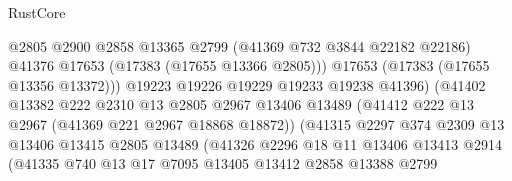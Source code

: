 \begin{lexlean}{RustCore}
\begin{coremodule}
                                          @2805
                                          @2900
                                          @2858
                                          @13365
                                          @2799
                                          (@41369 @732 @3844 @22182 @22186)
                                          @41376
                                          @17653
                                          (@17383 (@17655 @13366 @2805)))
                                        @17653
                                        (@17383 (@17655 @13356 @13372)))
                                      @19223
                                      @19226
                                      @19229
                                      @19233
                                      @19238
                                      @41396)
                                    (@41402
                                      @13382
                                      @222
                                      @2310
                                      @13
                                      @2805
                                      @2967
                                      @13406
                                      @13489
                                      (@41412 @222 @13 @2967 (@41369 @221 @2967 @18868 @18872))
                                      (@41315
                                        @2297
                                        @374
                                        @2309
                                        @13
                                        @13406
                                        @13415
                                        @2805
                                        @13489
                                        (@41326
                                          @2296
                                          @18
                                          @11
                                          @13406
                                          @13413
                                          @2914
                                          (@41335
                                            @740
                                            @13
                                            @17
                                            @7095
                                            @13405
                                            @13412
                                            @2858
                                            @13388
                                            @2799

\end{coremodule}
\end{lexlean}
